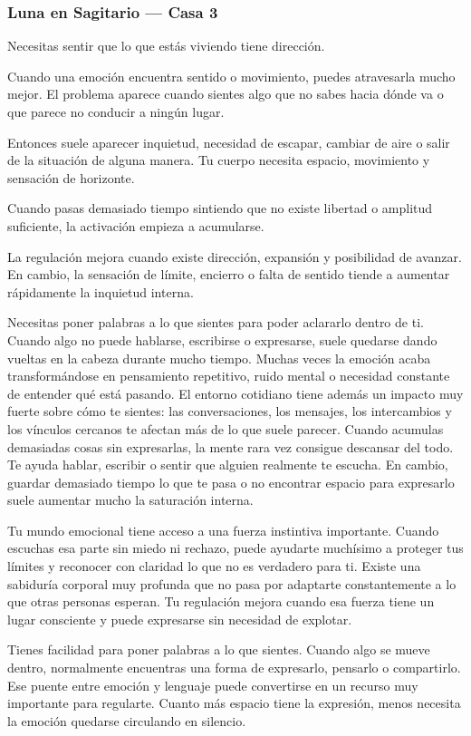 \documentclass[11pt,a4paper]{article}
\begin{document}
\subsubsection*{Luna en Sagitario — Casa 3}

Necesitas sentir que lo que estás viviendo tiene dirección.

Cuando una emoción encuentra sentido o movimiento, puedes atravesarla mucho mejor. El problema aparece cuando sientes algo que no sabes hacia dónde va o que parece no conducir a ningún lugar.

Entonces suele aparecer inquietud, necesidad de escapar, cambiar de aire o salir de la situación de alguna manera. Tu cuerpo necesita espacio, movimiento y sensación de horizonte.

Cuando pasas demasiado tiempo sintiendo que no existe libertad o amplitud suficiente, la activación empieza a acumularse.

La regulación mejora cuando existe dirección, expansión y posibilidad de avanzar. En cambio, la sensación de límite, encierro o falta de sentido tiende a aumentar rápidamente la inquietud interna.

Necesitas poner palabras a lo que sientes para poder aclararlo dentro de ti. Cuando algo no puede hablarse, escribirse o expresarse, suele quedarse dando vueltas en la cabeza durante mucho tiempo. Muchas veces la emoción acaba transformándose en pensamiento repetitivo, ruido mental o necesidad constante de entender qué está pasando. El entorno cotidiano tiene además un impacto muy fuerte sobre cómo te sientes: las conversaciones, los mensajes, los intercambios y los vínculos cercanos te afectan más de lo que suele parecer. Cuando acumulas demasiadas cosas sin expresarlas, la mente rara vez consigue descansar del todo. Te ayuda hablar, escribir o sentir que alguien realmente te escucha. En cambio, guardar demasiado tiempo lo que te pasa o no encontrar espacio para expresarlo suele aumentar mucho la saturación interna.

Tu mundo emocional tiene acceso a una fuerza instintiva importante. Cuando escuchas esa parte sin miedo ni rechazo, puede ayudarte muchísimo a proteger tus límites y reconocer con claridad lo que no es verdadero para ti. Existe una sabiduría corporal muy profunda que no pasa por adaptarte constantemente a lo que otras personas esperan. Tu regulación mejora cuando esa fuerza tiene un lugar consciente y puede expresarse sin necesidad de explotar.

Tienes facilidad para poner palabras a lo que sientes. Cuando algo se mueve dentro, normalmente encuentras una forma de expresarlo, pensarlo o compartirlo. Ese puente entre emoción y lenguaje puede convertirse en un recurso muy importante para regularte. Cuanto más espacio tiene la expresión, menos necesita la emoción quedarse circulando en silencio.
\end{document}
